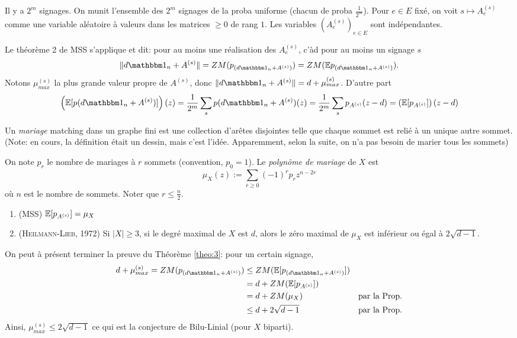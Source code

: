 Il y a $2^m$ signages. On munit l'ensemble des $2^m$ signages de la proba uniforme (chacun de proba
$\frac{1}{2^m}$). Pour $e \in E$ fixé, on voit $s \mapsto A_e^{(s)}$ comme une variable aléatoire à valeurs
dans les matrices $\geq 0$ de rang $1$. Les variables $(A_e^{(s)})_{e \in E}$ sont indépendantes.

Le théorème 2 de MSS s'applique et dit: pour au moins une réalisation des $A_e^{(s)}$, c'àd pour au moins un
signage $s$ 
\[ \|d \un_n + A^{(s)}\| = ZM(p_{(d\un_n + A^{(s)})}) = ZM(\E p_{(d \un_n + A^{(s)})}). \]
Notons $\mu_{max}^{(s)}$ la plus grande valeur propre de $A^{(s)}$, donc $\|d \un_n + A^{(s)}\| = d +
\mu_{max}^{(s)}$. D'autre part 
\[ \left(\E[p(d \un_n + A^{(s)})]\right)(z) = \frac{1}{2^m} \sum_{s}^{} p(d \un_n + A^{(s)})(z) =
  \frac{1}{2^m} \sum_{s}^{}p_{A^{(s)}}(z-d) = \left( \E[p_{A^{(s)}}]\right)(z-d) \]

\begin{defi}
  Un \emph{mariage} \og matching\fg{} dans un graphe fini est une collection d'arêtes disjointes
  telle que chaque sommet est relié à un unique autre sommet. (Note: en cours, la définition était un dessin,
  mais c'est l'idée. Apparemment, selon la suite, on n'a pas besoin de \og marier\fg{} tous les sommets)
\end{defi}

On note $p_r$ le nombre de mariages à $r$ sommets (convention, $p_0 = 1$). Le \emph{polynôme de mariage} de $X$ est 
\[ \mu_X(z) := \sum_{r \geq 0}^{} (-1)^r p_r z^{n - 2r} \]
où $n$ est le nombre de sommets. Noter que $r \leq \frac{n}{2}$.

\begin{prop}
  \begin{enumerate}
  \item (MSS) $\mathbb{E}[p_{A^{(s)}}] = \mu_X$
  \item (\textsc{Heilmann-Lieb}, 1972) Si $|X| \geq 3$, si le degré maximal de $X$ est $d$, alors le zéro
    maximal de $\mu_X$ est inférieur ou égal à $2 \sqrt{d-1}$.
  \end{enumerate}
\end{prop}

On peut à présent terminer la preuve du Théorème \ref{theo:3}: pour un certain signage, 
\begin{align*}
  d + \mu_{max}^{(s)} = ZM(p_{(d \un_n + A^{(s)})})
  &\leq ZM(\E[p_{(d\un_n + A^{(s)})}])\\
  &= d + ZM(\E[p_{A^{(s)}}]) \\
  &= d + ZM(\mu_X) & \text{par la Prop.}\\
  &\leq d + 2\sqrt{d-1} & \text{par la Prop.}
\end{align*}
Ainsi, $\mu_{max}^{(s)} \leq 2 \sqrt{d-1}$ ce qui est la conjecture de Bilu-Linial (pour $X$ biparti).

